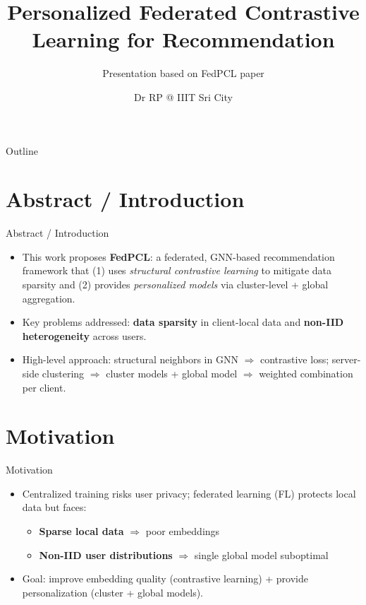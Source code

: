 \documentclass{beamer}
\author{Dr RP @ IIIT Sri City}
\title{Personalized Federated Contrastive Learning for Recommendation}
\subtitle{Presentation based on FedPCL paper}
\institute{IIIT Sri City — Group Project}
\date{}
\begin{document}
\begin{frame}
  \titlepage
\end{frame}

\begin{frame}{Outline}
  \tableofcontents[sectionstyle=show,subsectionstyle=show/shaded/hide]
\end{frame}

\section{Abstract / Introduction}
\begin{frame}{Abstract / Introduction}
  \begin{itemize}
    \item This work proposes \textbf{FedPCL}: a federated, GNN-based recommendation framework that (1) uses \emph{structural contrastive learning} to mitigate data sparsity and (2) provides \emph{personalized models} via cluster-level + global aggregation.
    \item Key problems addressed: \textbf{data sparsity} in client-local data and \textbf{non-IID heterogeneity} across users.
    \item High-level approach: structural neighbors in GNN $\Rightarrow$ contrastive loss; server-side clustering $\Rightarrow$ cluster models + global model $\Rightarrow$ weighted combination per client.
  \end{itemize}
\end{frame}

\section{Motivation}
\begin{frame}{Motivation}
  \begin{itemize}
    \item Centralized training risks user privacy; federated learning (FL) protects local data but faces:
      \begin{itemize}
        \item \textbf{Sparse local data} $\Rightarrow$ poor embeddings
        \item \textbf{Non-IID user distributions} $\Rightarrow$ single global model suboptimal
      \end{itemize}
    \item Goal: improve embedding quality (contrastive learning) + provide personalization (cluster + global models).
  \end{itemize}
\end{frame}
\end{document}
